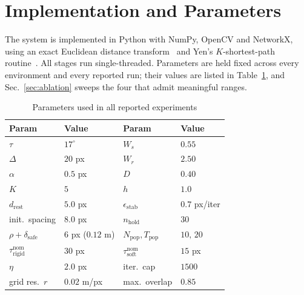 \documentclass[conference]{IEEEtran}
\begin{document}
\section{Implementation and Parameters}
\label{sec:impl}
The system is implemented in Python with NumPy, OpenCV and NetworkX, using an exact Euclidean distance transform~\cite{felzenszwalb2012} and Yen's $K$-shortest-path routine~\cite{yen1971}. All stages run single-threaded. Parameters are held fixed across every environment and every reported run; their values are listed in Table~\ref{tab:params}, and Sec.~\ref{sec:ablation} sweeps the four that admit meaningful ranges.
\begin{table}[htbp]
\caption{Parameters used in all reported experiments}
\label{tab:params}
\begin{center}
\begin{tabular}{@{}llll@{}}
\toprule
\textbf{Param} & \textbf{Value} & \textbf{Param} & \textbf{Value} \\ \midrule
$\tau$ & $17^\circ$ & $W_s$ & $0.55$ \\
$\Delta$ & $20$ px & $W_r$ & $2.50$ \\
$\alpha$ & $0.5$ px & $D$ & $0.40$ \\
$K$ & $5$ & $h$ & $1.0$ \\
$d_{\mathrm{rest}}$ & $5.0$ px & $\epsilon_{\mathrm{stab}}$ & $0.7$ px/iter \\
init.\ spacing & $8.0$ px & $n_{\mathrm{hold}}$ & $30$ \\
$\rho+\delta_{\mathrm{safe}}$ & $6$ px ($0.12$ m) & $N_{\mathrm{pop}},T_{\mathrm{pop}}$ & $10,\,20$ \\
$\tau^{\mathrm{nom}}_{\mathrm{rigid}}$ & $30$ px & $\tau^{\mathrm{nom}}_{\mathrm{soft}}$ & $15$ px \\
$\eta$ & $2.0$ px & iter.\ cap & $1500$ \\
grid res.\ $r$ & $0.02$ m/px & max.\ overlap & $0.85$ \\ \bottomrule
\end{tabular}
\end{center}
\end{table}
\end{document}
